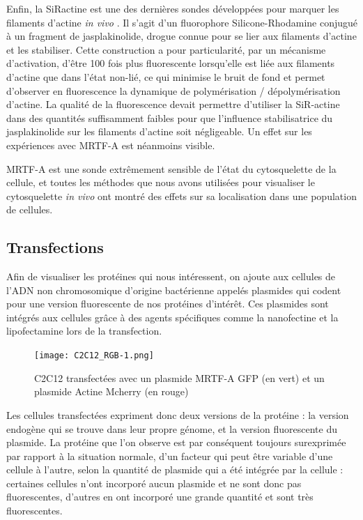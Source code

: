 Enfin, la SiRactine est une des dernières sondes développées pour marquer les filaments d'actine \textit{in vivo} \parencite{lukinavicius_fluorogenic_2014}. Il s'agit d'un fluorophore Silicone-Rhodamine conjugué à un fragment de jasplakinolide, drogue connue pour se lier aux filaments d'actine et les stabiliser. Cette construction a pour particularité, par un mécanisme d'activation, d'être 100 fois plus fluorescente lorsqu'elle est liée aux filaments d'actine que dans l'état non-lié, ce qui minimise le bruit de fond et permet d’observer en fluorescence la dynamique de polymérisation / dépolymérisation d’actine. La qualité de la fluorescence devait permettre d'utiliser la SiR-actine dans des quantités suffisamment faibles pour que l'influence stabilisatrice du jasplakinolide sur les filaments d'actine soit négligeable. Un effet sur les expériences avec MRTF-A est néanmoins visible. 

MRTF-A est une sonde extrêmement sensible de l'état du cytosquelette de la cellule, et toutes les méthodes que nous avons utilisées pour visualiser le cytosquelette \textit{in vivo} ont montré des effets sur sa localisation dans une population de cellules. 
	
	
	\subsection{Transfections}
	Afin de visualiser les protéines qui nous intéressent, on ajoute aux cellules de l'ADN non chromosomique d'origine bactérienne appelés plasmides qui codent pour une version fluorescente de nos protéines d'intérêt. Ces plasmides sont intégrés aux cellules grâce à des agents spécifiques comme la nanofectine et la lipofectamine lors de la transfection. 
	
	\begin{figure}
	\texttt{[image: C2C12\_RGB-1.png]}
	\caption{C2C12 transfectées avec un plasmide MRTF-A GFP (en vert) et un plasmide Actine Mcherry (en rouge)}
	\end{figure}
	
	Les cellules transfectées expriment donc deux versions de la protéine : la version endogène qui se trouve dans leur propre génome, et la version fluorescente du plasmide. La protéine que l'on observe est par conséquent toujours surexprimée par rapport à la situation normale, d'un facteur qui peut être variable d'une cellule à l'autre, selon la quantité de plasmide qui a été intégrée par la cellule : certaines cellules n'ont incorporé aucun plasmide et ne sont donc pas fluorescentes, d'autres en ont incorporé une grande quantité et sont très fluorescentes. 
	
